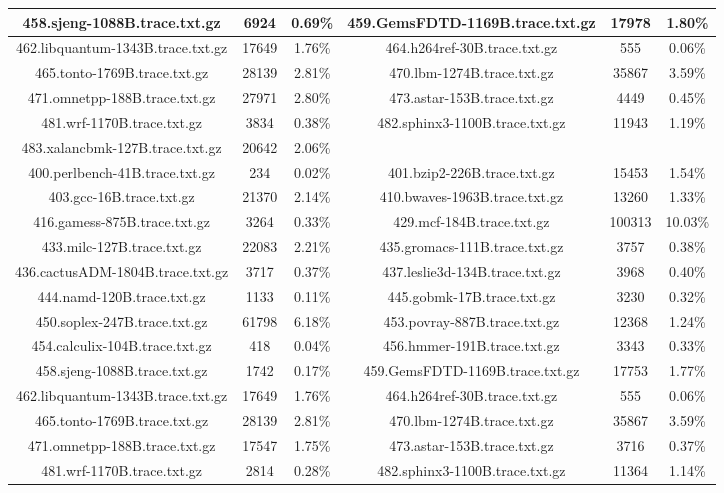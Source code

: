 \begin{table}[H]
\begin{tabular}{|c|c|c|c|c|c|}
458.sjeng-1088B.trace.txt.gz & 6924 & 0.69\% & 459.GemsFDTD-1169B.trace.txt.gz & 17978 & 1.80\% \\\hline
462.libquantum-1343B.trace.txt.gz & 17649 & 1.76\% & 464.h264ref-30B.trace.txt.gz & 555 & 0.06\% \\\hline
465.tonto-1769B.trace.txt.gz & 28139 & 2.81\% & 470.lbm-1274B.trace.txt.gz & 35867 & 3.59\% \\\hline
471.omnetpp-188B.trace.txt.gz & 27971 & 2.80\% & 473.astar-153B.trace.txt.gz & 4449 & 0.45\% \\\hline
481.wrf-1170B.trace.txt.gz & 3834 & 0.38\% & 482.sphinx3-1100B.trace.txt.gz & 11943 & 1.19\% \\\hline
483.xalancbmk-127B.trace.txt.gz & 20642 & 2.06\% & & & &  \\\hline
400.perlbench-41B.trace.txt.gz & 234 & 0.02\% & 401.bzip2-226B.trace.txt.gz & 15453 & 1.54\% \\\hline
403.gcc-16B.trace.txt.gz & 21370 & 2.14\% & 410.bwaves-1963B.trace.txt.gz & 13260 & 1.33\% \\\hline
416.gamess-875B.trace.txt.gz & 3264 & 0.33\% & 429.mcf-184B.trace.txt.gz & 100313 & 10.03\% \\\hline
433.milc-127B.trace.txt.gz & 22083 & 2.21\% & 435.gromacs-111B.trace.txt.gz & 3757 & 0.38\% \\\hline
436.cactusADM-1804B.trace.txt.gz & 3717 & 0.37\% & 437.leslie3d-134B.trace.txt.gz & 3968 & 0.40\% \\\hline
444.namd-120B.trace.txt.gz & 1133 & 0.11\% & 445.gobmk-17B.trace.txt.gz & 3230 & 0.32\% \\\hline
450.soplex-247B.trace.txt.gz & 61798 & 6.18\% & 453.povray-887B.trace.txt.gz & 12368 & 1.24\% \\\hline
454.calculix-104B.trace.txt.gz & 418 & 0.04\% & 456.hmmer-191B.trace.txt.gz & 3343 & 0.33\% \\\hline
458.sjeng-1088B.trace.txt.gz & 1742 & 0.17\% & 459.GemsFDTD-1169B.trace.txt.gz & 17753 & 1.77\% \\\hline
462.libquantum-1343B.trace.txt.gz & 17649 & 1.76\% & 464.h264ref-30B.trace.txt.gz & 555 & 0.06\% \\\hline
465.tonto-1769B.trace.txt.gz & 28139 & 2.81\% & 470.lbm-1274B.trace.txt.gz & 35867 & 3.59\% \\\hline
471.omnetpp-188B.trace.txt.gz & 17547 & 1.75\% & 473.astar-153B.trace.txt.gz & 3716 & 0.37\% \\\hline
481.wrf-1170B.trace.txt.gz & 2814 & 0.28\% & 482.sphinx3-1100B.trace.txt.gz & 11364 & 1.14\% \\\hline

\end{tabular}
\end{table}
